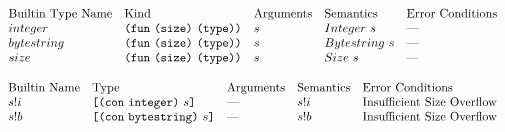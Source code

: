 \documentclass[../main.tex]{subfiles}
\begin{document}
    
    
\begin{figure*}[t]
    \footnotesize
    \centering
    
    \[\begin{array}{lllll}
        \textrm{Builtin Type Name} & \textrm{Kind} & \textrm{Arguments} & \textrm{Semantics} & \textrm{Error Conditions}\\
        
        integer & \texttt{(} \texttt{fun} ~ \texttt{(} \texttt{size} \texttt{)}{} ~ \texttt{(} \texttt{type} \texttt{)}{} \texttt{)} & s & Integer ~ s & \textrm{---}\\
        
        bytestring & \texttt{(} \texttt{fun} ~ \texttt{(} \texttt{size} \texttt{)}{} ~ \texttt{(} \texttt{type} \texttt{)}{} \texttt{)} & s & Bytestring ~ s & \textrm{---}\\
        
        size & \texttt{(} \texttt{fun} ~ \texttt{(} \texttt{size} \texttt{)}{} ~ \texttt{(} \texttt{type} \texttt{)}{} \texttt{)} & s & Size ~ s & \textrm{---}\\
    \end{array}\]
    
    \[\begin{array}{lllll}
        \textrm{Builtin Name} & \textrm{Type} & \textrm{Arguments} & \textrm{Semantics} & \textrm{Error Conditions}\\
        
        s!i   & \texttt{[} \texttt{(} \texttt{con} ~ \texttt{integer} \texttt{)} ~ s \texttt{]}      &   \textrm{---}   &    s!i    &   \textrm{Insufficient Size Overflow}\\
        
        s!b   & \texttt{[} \texttt{(} \texttt{con} ~ \texttt{bytestring} \texttt{)} ~ s \texttt{]}   &   \textrm{---}   &    s!b    &   \textrm{Insufficient Size Overflow}\\
        

\end{array}\]
\end{figure*}
\end{document}
